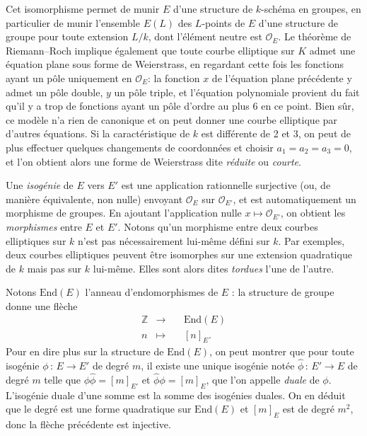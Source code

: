 \documentclass[11pt,a4paper]{article}
\newcommand{\Z}{\mathbb{Z}}
\renewcommand{\O}{\mathcal{O}}
\newcommand{\vers}{\longrightarrow}
\newcommand{\End}{\mathrm{End}}
\newcommand{\de}{\,:\,}
\renewcommand{\v}{\vspace{5mm}}
\theoremstyle{definition}
\begin{document}
Cet isomorphisme permet de munir $E$ d'une structure de $k$-schéma en groupes, en particulier de munir l'ensemble $E(L)$ des $L$-points de $E$ d'une structure de groupe pour toute extension $L/k$, dont l'élément neutre est $\O_E$. Le théorème de Riemann--Roch implique également que toute courbe elliptique sur $K$ admet une équation plane sous forme de Weierstrass, en regardant cette fois les fonctions ayant un pôle uniquement en $\O_E$: la fonction $x$ de l'équation plane précédente y admet un pôle double, $y$ un pôle triple, et l'équation polynomiale provient du fait qu'il y a trop de fonctions ayant un pôle d'ordre au plus 6 en ce point. Bien sûr, ce modèle n'a rien de canonique et on peut donner une courbe elliptique par d'autres équations. Si la caractéristique de $k$ est différente de 2 et 3, on peut de plus effectuer quelques changements de coordonnées et choisir $a_1 = a_2 = a_3 = 0$, et l'on obtient alors une forme de Weierstrass dite \emph{réduite} ou \emph{courte}.

\v

Une \emph{isogénie} de $E$ vers $E'$ est une application rationnelle surjective (ou, de manière équivalente, non nulle) envoyant $\O_E$ sur $\O_{E'}$, et est automatiquement un morphisme de groupes. 
En ajoutant l'application nulle $x\mapsto \O_{E'}$, on obtient les \emph{morphismes} entre $E$ et $E'$. Notons qu'un morphisme entre deux courbes elliptiques sur $k$ n'est pas nécessairement lui-même défini sur $k$. Par exemples, deux courbes elliptiques peuvent être isomorphes sur une extension quadratique de $k$ mais pas sur $k$ lui-même. Elles sont alors dites \emph{tordues} l'une de l'autre.

Notons $\End(E)$ l'anneau d'endomorphismes de $E$ : la structure de groupe donne une flèche
$$\begin{aligned}
&\Z &\longrightarrow&\ &\End(E) &\\
&n &\longmapsto& &[n]_E .\ \ &
\end{aligned}$$
Pour en dire plus sur la structure de $\End(E)$, on peut montrer que pour toute isogénie $\phi\de E\vers E'$ de degré $m$, il existe une unique isogénie notée $\widehat{\phi}\de E'\vers E$ de degré $m$ telle que $\phi\widehat{\phi}=[m]_{E'}$ et $\widehat{\phi}\phi=[m]_{E}$, que l'on appelle \emph{duale} de $\phi$. L'isogénie duale d'une somme est la somme des isogénies duales. On en déduit que le degré est une forme quadratique sur $\End(E)$ et $[m]_E$ est de degré $m^2$, donc la flèche précédente est injective.
\end{document}
